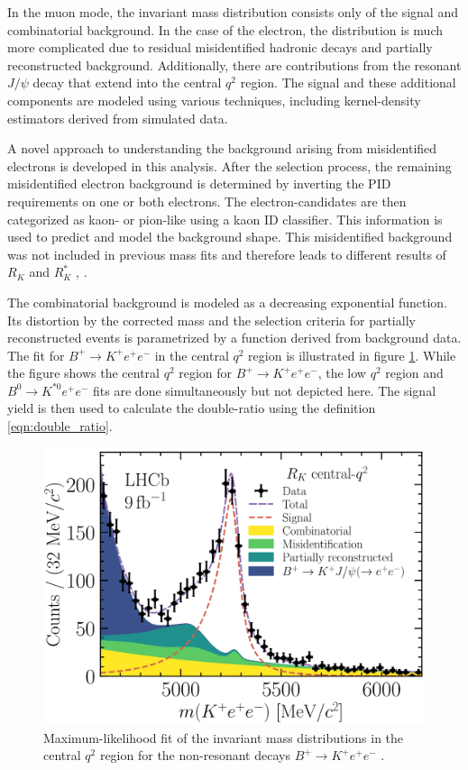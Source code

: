 In the muon mode, the invariant mass distribution consists only of the signal and 
combinatorial background. 
In the case of the electron, the distribution is much more complicated due to 
residual misidentified hadronic decays and partially reconstructed background. 
Additionally, there are contributions from the resonant $J\!/\!\psi$ decay that extend 
into the central $q^2$ region. 
The signal and these additional components are modeled using various techniques, 
including kernel-density estimators derived from simulated data.

A novel approach to understanding the background arising from misidentified 
electrons is developed in this analysis. After the selection process, the remaining 
misidentified electron background is determined by inverting the PID requirements 
on one or both electrons. The electron-candidates are then categorized as kaon- or 
pion-like using a kaon ID classifier. This information is used to predict and model 
the background shape.
This misidentified background was not included in previous mass fits and therefore
leads to different results of $R_K$ and $R_K^*$ \cite{previous_RK}, \cite{previous_RK*}.

The combinatorial background is modeled as a decreasing exponential function. 
Its distortion by the corrected mass and the selection criteria for partially 
reconstructed events is parametrized by a function derived from background data. 
The fit for $B^+\to K^+e^+e^-$ in the central $q^2$ region is illustrated in 
figure \ref{fig:fits}. 
While the figure shows the central $q^2$ region for $B^+\to K^+e^+e^-$, the low 
$q^2$ region and $B^0\to K^{*0}e^+e^-$ fits are done simultaneously but not depicted 
here.
The signal yield is then used to calculate 
the double-ratio using the definition \eqref{eqn:double_ratio}.

\begin{figure}
    \centering
    \includegraphics[width=0.84\linewidth]{figures/fits_3.png}
    \caption{Maximum-likelihood fit of the invariant mass distributions in the central $q^2$ region for the non-resonant decays $B^+\to K^+e^+e^-$ \cite{lhcbcollaboration2022test}.}
    \label{fig:fits}
\end{figure}

